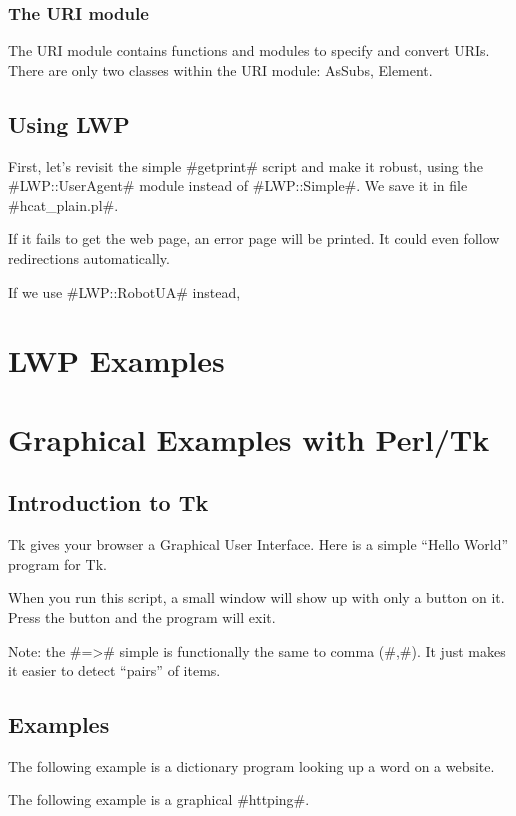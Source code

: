 \documentclass[a4paper]{article}
\begin{document}
\subsubsection{The URI module}

The URI module contains functions and modules to specify and convert URIs.
There are only two classes within the URI module: AsSubs, Element.

\subsection{Using LWP}

First, let's revisit the simple #getprint# script and make it robust,
using the #LWP::UserAgent# module instead of #LWP::Simple#.
We save it in file #hcat_plain.pl#.

If it fails to get the web page, an error page will be printed.
It could even follow redirections automatically.

If we use #LWP::RobotUA# instead,


\section{LWP Examples}






\section{Graphical Examples with Perl/Tk}

\subsection{Introduction to Tk}

Tk gives your browser a Graphical User Interface.
Here is a simple ``Hello World'' program for Tk.

When you run this script, a small window will show up with only a button on it.
Press the button and the program will exit.

Note: the #=># simple is functionally the same to comma (#,#).
It just makes it easier to detect ``pairs'' of items.

\subsection{Examples}

The following example is a dictionary program looking up a word on a website.

The following example is a graphical #httping#.

\end{document}
